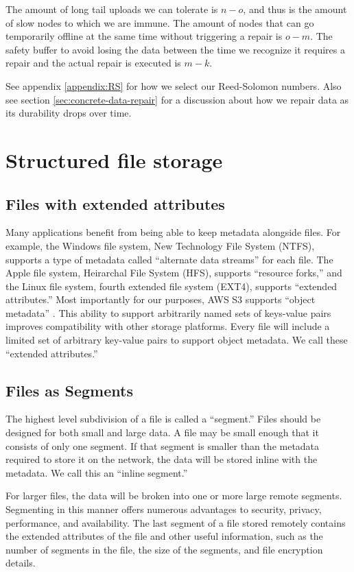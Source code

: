 \documentclass[11pt,fleqn,openany]{book}
\begin{document}
The amount of long tail uploads we can tolerate is $n-o$, and thus is the amount
of slow nodes to which we are immune.  The amount of nodes that can go
temporarily offline at the same time without triggering a repair is $o-m$. The
safety buffer to avoid losing the data between the time we recognize it requires
a repair and the actual repair is executed is $m-k$.

See appendix \ref{appendix:RS} for how we select our Reed-Solomon numbers.
Also see section \ref{sec:concrete-data-repair} for a discussion about
how we repair data as its durability drops over time.

\section{Structured file storage}\label{sec:structured-file-storage}

\subsection{Files with extended attributes}

Many applications benefit from being able to keep metadata alongside files. For
example, the Windows file system, New Technology File System (NTFS), supports a type of metadata called
``alternate data streams'' for each file. The Apple file system, Heirarchal File System (HFS), supports
``resource forks,'' and the Linux file system, fourth extended file system (EXT4), supports
``extended attributes.'' Most importantly for
our purposes, AWS S3 supports ``object metadata'' \cite{s3-object-meta}. This ability to support arbitrarily named sets of keys-value pairs improves
compatibility with other storage platforms. Every file will include a
limited set of arbitrary key-value pairs to support object metadata. We call
these ``extended attributes.''

\subsection{Files as Segments}

The highest level subdivision of a file is called a ``segment.''
Files should be designed for both small and large data.
A file may be small enough that it consists of only one segment.
If that segment is smaller than the metadata required to store it on the
network, the data will be stored inline with the metadata. We call this an
``inline segment.''

For larger files, the data will be broken
into one or more large remote segments. Segmenting in this manner offers
numerous advantages to security, privacy, performance, and availability. The
last segment of a file stored remotely contains the extended attributes of
the file and other useful information, such as the number of segments in the
file, the size of the segments, and file encryption details.
\end{document}
